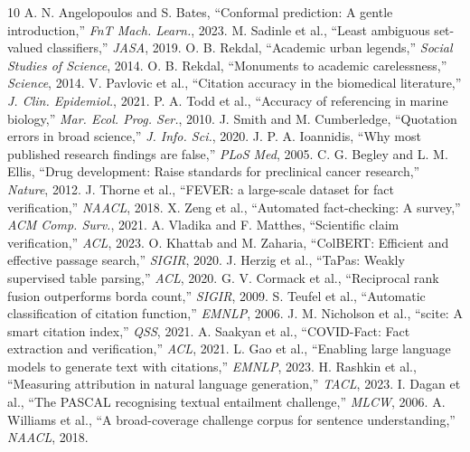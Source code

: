 \documentclass[sigconf]{acmart}
\begin{document}
\begin{thebibliography}{10}
 A. N. Angelopoulos and S. Bates, ``Conformal prediction: A gentle introduction,'' \emph{FnT Mach. Learn.}, 2023.
 M. Sadinle et al., ``Least ambiguous set-valued classifiers,'' \emph{JASA}, 2019.
 O. B. Rekdal, ``Academic urban legends,'' \emph{Social Studies of Science}, 2014.
 O. B. Rekdal, ``Monuments to academic carelessness,'' \emph{Science}, 2014.
 V. Pavlovic et al., ``Citation accuracy in the biomedical literature,'' \emph{J. Clin. Epidemiol.}, 2021.
 P. A. Todd et al., ``Accuracy of referencing in marine biology,'' \emph{Mar. Ecol. Prog. Ser.}, 2010.
 J. Smith and M. Cumberledge, ``Quotation errors in broad science,'' \emph{J. Info. Sci.}, 2020.
 J. P. A. Ioannidis, ``Why most published research findings are false,'' \emph{PLoS Med}, 2005.
 C. G. Begley and L. M. Ellis, ``Drug development: Raise standards for preclinical cancer research,'' \emph{Nature}, 2012.
 J. Thorne et al., ``FEVER: a large-scale dataset for fact verification,'' \emph{NAACL}, 2018.
 X. Zeng et al., ``Automated fact-checking: A survey,'' \emph{ACM Comp. Surv.}, 2021.
 A. Vladika and F. Matthes, ``Scientific claim verification,'' \emph{ACL}, 2023.
 O. Khattab and M. Zaharia, ``ColBERT: Efficient and effective passage search,'' \emph{SIGIR}, 2020.
 J. Herzig et al., ``TaPas: Weakly supervised table parsing,'' \emph{ACL}, 2020.
 G. V. Cormack et al., ``Reciprocal rank fusion outperforms borda count,'' \emph{SIGIR}, 2009.
 S. Teufel et al., ``Automatic classification of citation function,'' \emph{EMNLP}, 2006.
 J. M. Nicholson et al., ``scite: A smart citation index,'' \emph{QSS}, 2021.
 A. Saakyan et al., ``COVID-Fact: Fact extraction and verification,'' \emph{ACL}, 2021.
 L. Gao et al., ``Enabling large language models to generate text with citations,'' \emph{EMNLP}, 2023.
 H. Rashkin et al., ``Measuring attribution in natural language generation,'' \emph{TACL}, 2023.
 I. Dagan et al., ``The PASCAL recognising textual entailment challenge,'' \emph{MLCW}, 2006.
 A. Williams et al., ``A broad-coverage challenge corpus for sentence understanding,'' \emph{NAACL}, 2018.

\end{thebibliography}
\end{document}
